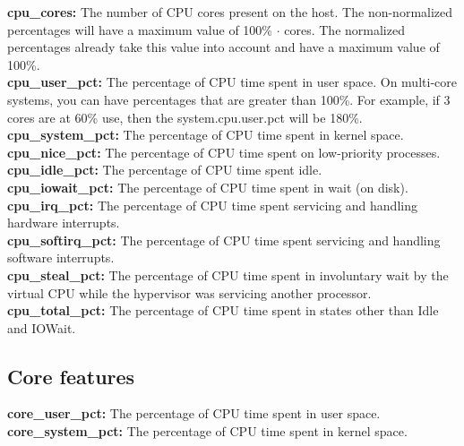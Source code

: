 \documentclass{iosart2c}
\begin{document}
\textbf{cpu\_cores:} The number of CPU cores present on the host. The non-normalized percentages will have a maximum value of 100\% $\cdot$ cores. The normalized percentages already take this value into account and have a maximum value of 100\%.\\

\textbf{cpu\_user\_pct:} The percentage of CPU time spent in user space. On multi-core systems, you can have percentages that are greater than 100\%. For example, if 3 cores are at 60\% use, then the system.cpu.user.pct will be 180\%.\\

\textbf{cpu\_system\_pct:} The percentage of CPU time spent in kernel space.\\

\textbf{cpu\_nice\_pct:} The percentage of CPU time spent on low-priority processes.\\

\textbf{cpu\_idle\_pct:} The percentage of CPU time spent idle.\\

\textbf{cpu\_iowait\_pct:} The percentage of CPU time spent in wait (on disk).\\

\textbf{cpu\_irq\_pct:} The percentage of CPU time spent servicing and handling hardware interrupts.\\

\textbf{cpu\_softirq\_pct:} The percentage of CPU time spent servicing and handling software interrupts.\\

\textbf{cpu\_steal\_pct:} The percentage of CPU time spent in involuntary wait by the virtual CPU while the hypervisor was servicing another processor.\\

\textbf{cpu\_total\_pct:} The percentage of CPU time spent in states other than Idle and IOWait.\\


\subsection{Core features}

\textbf{core\_user\_pct:} The percentage of CPU time spent in user space.\\

\textbf{core\_system\_pct:} The percentage of CPU time spent in kernel space.\\
\end{document}
